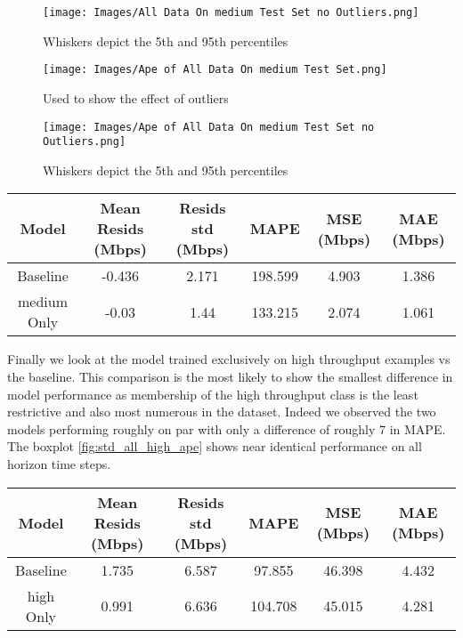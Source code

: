 \begin{figure}[H]
\texttt{[image: Images/All Data On medium Test Set no Outliers.png]}
\centering
\caption{Whiskers depict the 5th and 95th percentiles}
\label{fig:std_all_medium_resids}
\end{figure}

\begin{figure}[H]
\texttt{[image: Images/Ape of All Data On medium Test Set.png]}
\centering
\caption{Used to show the effect of outliers}
\label{fig:std_all_medium_ape_outliers}
\end{figure}

\begin{figure}[!htb]
\texttt{[image: Images/Ape of All Data On medium Test Set no Outliers.png]}
\centering
\caption{Whiskers depict the 5th and 95th percentiles}
\label{fig:std_all_medium_ape}
\end{figure}

\begin{table}[H]
\centering
\begin{tabular}{|c|c|c|c|c|c|}
\hline
{Model} & {Mean Resids (Mbps)} & {Resids std (Mbps)} & {MAPE} & {MSE (Mbps)} & {MAE (Mbps)}\\
\hline
Baseline & -0.436 & 2.171 & 198.599 & 4.903 & 1.386\\
\hline
medium Only & -0.03 & 1.44 & 133.215 & 2.074 & 1.061\\
\hline
\end{tabular}
\label{tab:std_all_medium}
\end{table}

\newpage
Finally we look at the model trained exclusively on high throughput examples vs the baseline. This comparison is the most likely to show the smallest difference in model performance as membership of the high throughput class is the least restrictive and also most numerous in the dataset. Indeed we observed the two models performing roughly on par with only a difference of roughly 7 in MAPE. The boxplot \ref{fig:std_all_high_ape} shows near identical performance on all horizon time steps.

\begin{table}[!htb]
\centering
\begin{tabular}{|c|c|c|c|c|c|}
\hline
{Model} & {Mean Resids (Mbps)} & {Resids std (Mbps)} & {MAPE} & {MSE (Mbps)} & {MAE (Mbps)}\\
\hline
Baseline & 1.735 & 6.587 & 97.855 & 46.398 & 4.432\\
\hline
high Only & 0.991 & 6.636 & 104.708 & 45.015 & 4.281\\
\hline
\end{tabular}
\label{tab:std_all_high}
\end{table}

